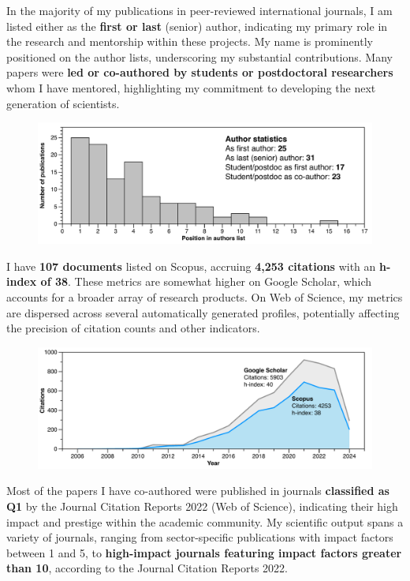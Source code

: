 \documentclass[11pt]{article}
\begin{document}
{\normalfont In the majority of my publications in peer-reviewed international journals, I am listed either as the \textbf{first or last} (senior) author, indicating my primary role in the research and mentorship within these projects. My name is prominently positioned on the author lists, underscoring my substantial contributions. Many papers were \textbf{led or co-authored by students or postdoctoral researchers} whom I have mentored, highlighting my commitment to developing the next generation of scientists.}

\begin{figure}[h]
\centering
\includegraphics[width=\textwidth]{img/Manuscripts.pdf}
\end{figure}

{\normalfont I have \textbf{107 documents} listed on Scopus, accruing \textbf{4,253 citations} with an \textbf{h-index of 38}. These metrics are somewhat higher on Google Scholar, which accounts for a broader array of research products. On Web of Science, my metrics are dispersed across several automatically generated profiles, potentially affecting the precision of citation counts and other indicators.}

\begin{figure}[h]
\centering
\includegraphics[width=\textwidth]{img/CITATIONS.pdf}
\end{figure}

\newpage

{\normalfont Most of the papers I have co-authored were published in journals \textbf{classified as Q1} by the Journal Citation Reports 2022 (Web of Science), indicating their high impact and prestige within the academic community. My scientific output spans a variety of journals, ranging from sector-specific publications with impact factors between 1 and 5, to \textbf{high-impact journals featuring impact factors greater than 10}, according to the Journal Citation Reports 2022.}
\end{document}
